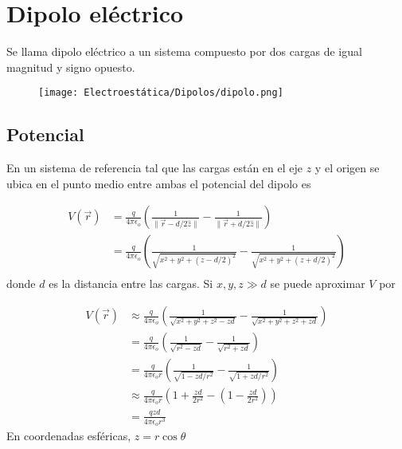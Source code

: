 \section{Dipolo eléctrico}

Se llama dipolo eléctrico a un sistema compuesto por dos cargas de igual magnitud y signo opuesto.

\begin{figure}[H]
    \centering
    \texttt{[image: Electroestática/Dipolos/dipolo.png]}
\end{figure}

\subsection{Potencial}

En un sistema de referencia tal que las cargas están en el eje $z$ y el origen se ubica en el punto medio entre ambas el potencial del dipolo es

\begin{equation}
\begin{split}
    V(\Vec{r}) &= \frac{q}{4\pi\epsilon_o}\left(
    \frac{1}{\|\Vec{r}-d/2\hat{z}\|}-
    \frac{1}{\|\Vec{r}+d/2\hat{z}\|}\right)\\
     &= \frac{q}{4\pi\epsilon_o}\left(
    \frac{1}{\sqrt{x^2+y^2+(z-d/2)^2}}-
    \frac{1}{\sqrt{x^2+y^2+(z+d/2)^2}}\right)\\
\end{split}
\nonumber
\end{equation}
\bigbreak
\bigbreak
donde $d$ es la distancia entre las cargas. Si $x,y,z \gg d$ se puede aproximar $V$ por

\begin{equation}
\begin{split}
    V(\Vec{r}) &\approx \frac{q}{4\pi\epsilon_o}\left(
    \frac{1}{\sqrt{x^2+y^2+z^2-zd}}-
    \frac{1}{\sqrt{x^2+y^2+z^2+zd}}\right)\\
    &= \frac{q}{4\pi\epsilon_o}\left(
    \frac{1}{\sqrt{r^2-zd}}-
    \frac{1}{\sqrt{r^2+zd}}\right)\\
    &= \frac{q}{4\pi\epsilon_o r}\left(
    \frac{1}{\sqrt{1-zd/r^2}}-
    \frac{1}{\sqrt{1+zd/r^2}}\right)\\
    &\approx \frac{q}{4\pi\epsilon_o r}\left(
    1+\frac{zd}{2r^2}-\left(1-
    \frac{zd}{2r^2}\right)\right)\\
    &= \frac{qzd}{4\pi\epsilon_o r^3}
\end{split}
\nonumber
\end{equation}
\bigbreak
En coordenadas esféricas, $z=r\cos{\theta}$

